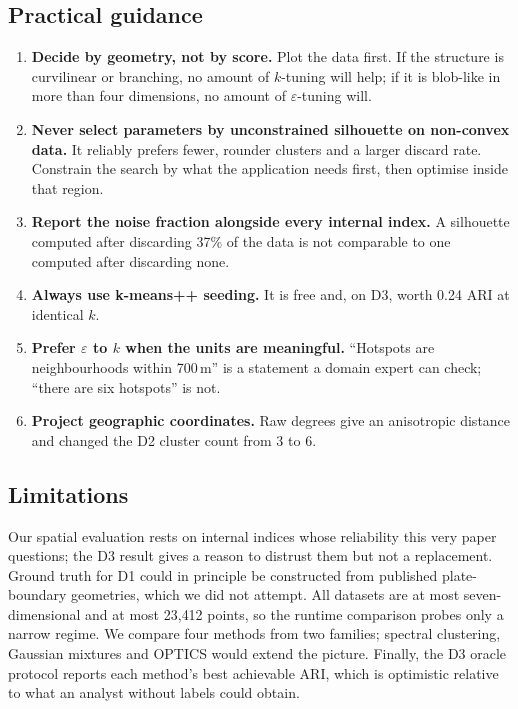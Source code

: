 \documentclass[11pt,a4paper]{article}
\begin{document}
\subsection{Practical guidance}\label{sec:guidance}
\begin{enumerate}\itemsep1pt
\item \textbf{Decide by geometry, not by score.} Plot the data first. If the
structure is curvilinear or branching, no amount of $k$-tuning will help; if it
is blob-like in more than four dimensions, no amount of $\varepsilon$-tuning
will.
\item \textbf{Never select parameters by unconstrained silhouette on non-convex
data.} It reliably prefers fewer, rounder clusters and a larger discard rate.
Constrain the search by what the application needs first, then optimise inside
that region.
\item \textbf{Report the noise fraction alongside every internal index.} A
silhouette computed after discarding 37\% of the data is not comparable to one
computed after discarding none.
\item \textbf{Always use k-means++ seeding.} It is free and, on D3, worth 0.24
ARI at identical $k$.
\item \textbf{Prefer $\varepsilon$ to $k$ when the units are meaningful.}
``Hotspots are neighbourhoods within 700\,m'' is a statement a domain expert can
check; ``there are six hotspots'' is not.
\item \textbf{Project geographic coordinates.} Raw degrees give an anisotropic
distance and changed the D2 cluster count from 3 to 6.
\end{enumerate}

\subsection{Limitations}
Our spatial evaluation rests on internal indices whose reliability this very
paper questions; the D3 result gives a reason to distrust them but not a
replacement. Ground truth for D1 could in principle be constructed from published
plate-boundary geometries, which we did not attempt. All datasets are at most
seven-dimensional and at most 23{,}412 points, so the runtime comparison probes
only a narrow regime. We compare four methods from two families; spectral
clustering, Gaussian mixtures and OPTICS would extend the picture. Finally, the
D3 oracle protocol reports each method's best achievable ARI, which is optimistic
relative to what an analyst without labels could obtain.
\end{document}
